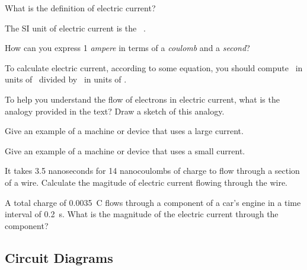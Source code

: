\documentclass[main.tex]{subfiles}
\begin{document}
\begin{exercise}
    What is the definition of electric current?
\end{exercise}

\begin{exercise}
    The SI unit of electric current is the \myfillin\ .
\end{exercise}

\begin{exercise}
    How can you express 1 \textit{ampere} in terms of a \textit{coulomb} and a \textit{second}?
\end{exercise}

\begin{exercise}
    To calculate electric current, according to some equation, you should compute \myfillin\ in units of \myfillin\ divided by \myfillin\ in units of \myfillin .
\end{exercise}

\begin{exercise}
    To help you understand the flow of electrons in electric current, what is the analogy provided in the text? Draw a sketch of this analogy.
\end{exercise}

\begin{exercise}
    Give an example of a machine or device that uses a large current.
\end{exercise}

\begin{exercise}
    Give an example of a machine or device that uses a small current.
\end{exercise}

\begin{exercise}
    It takes 3.5 nanoseconds for 14 nanocoulombs of charge to flow through a section of a wire. Calculate the magitude of electric current flowing through the wire.
\end{exercise}

\begin{exercise}
    A total charge of \qty{0.0035}{C} flows through a component of a car's engine in a time interval of \qty{0.2}{s}. What is the magnitude of the electric current through the component?
\end{exercise}

\cyanhrule

\subsection{Circuit Diagrams} \label{wpbAPw}
\end{document}
